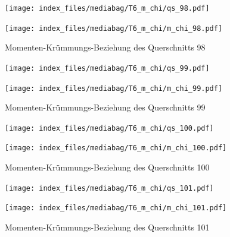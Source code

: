 \documentclass[
  11pt,
  letterpaper,
]{scrreprt}
\begin{document}
\begin{figure}[H]

\begin{minipage}{0.50\linewidth}
\texttt{[image: index\_files/mediabag/T6\_m\_chi/qs\_98.pdf]}\end{minipage}%
%
\begin{minipage}{0.50\linewidth}
\texttt{[image: index\_files/mediabag/T6\_m\_chi/m\_chi\_98.pdf]}\end{minipage}%

\caption{\label{fig-mchi_anhang}Momenten-Krümmungs-Beziehung des
Querschnitts 98}

\end{figure}%

\begin{figure}[H]

\begin{minipage}{0.50\linewidth}
\texttt{[image: index\_files/mediabag/T6\_m\_chi/qs\_99.pdf]}\end{minipage}%
%
\begin{minipage}{0.50\linewidth}
\texttt{[image: index\_files/mediabag/T6\_m\_chi/m\_chi\_99.pdf]}\end{minipage}%

\caption{\label{fig-mchi_anhang}Momenten-Krümmungs-Beziehung des
Querschnitts 99}

\end{figure}%

\begin{figure}[H]

\begin{minipage}{0.50\linewidth}
\texttt{[image: index\_files/mediabag/T6\_m\_chi/qs\_100.pdf]}\end{minipage}%
%
\begin{minipage}{0.50\linewidth}
\texttt{[image: index\_files/mediabag/T6\_m\_chi/m\_chi\_100.pdf]}\end{minipage}%

\caption{\label{fig-mchi_anhang}Momenten-Krümmungs-Beziehung des
Querschnitts 100}

\end{figure}%

\begin{figure}[H]

\begin{minipage}{0.50\linewidth}
\texttt{[image: index\_files/mediabag/T6\_m\_chi/qs\_101.pdf]}\end{minipage}%
%
\begin{minipage}{0.50\linewidth}
\texttt{[image: index\_files/mediabag/T6\_m\_chi/m\_chi\_101.pdf]}\end{minipage}%

\caption{\label{fig-mchi_anhang}Momenten-Krümmungs-Beziehung des
Querschnitts 101}

\end{figure}%
\end{document}

